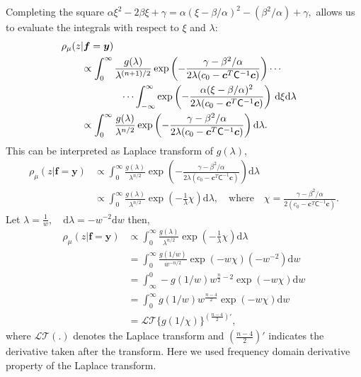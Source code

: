 \documentclass{iitthesis}          %
\newcommand{\bm}[1]{\boldsymbol{#1}}
\newcommand{\dif}[1]{\text{d}{#1}}
\newcommand{\D}[1]{\text{d}{#1}}
\newcommand{\vc}{\bm{c}}
\newcommand{\vf}{\bm{f}}
\newcommand{\vy}{\bm{y}}
\newcommand{\mC}{\mathsf{C}}
\begin{document}
Completing the square $
\alpha \xi^2 -2 \beta \xi + \gamma 
= \alpha (\xi -\beta/\alpha)^2  - (\beta^2/\alpha) + \gamma,
$
allows us to evaluate the integrals with respect to $\xi$ and $\lambda$:
\begin{align*}
\MoveEqLeft{\rho_{\mu}(z | \vf = \vy)} &
\\
& \propto \displaystyle \int_{0}^\infty  \frac{g(\lambda)}{\lambda^{(n+1)/2}}  \exp\left( -\frac{  \gamma - \beta^2/\alpha}{2\lambda(c_0  -\vc ^T \mC^{-1} \vc)} \right)  \cdots 
\\
& \qquad \qquad \cdots \int_{-\infty}^\infty  \exp\left( -\frac{\alpha (\xi -\beta/\alpha)^2}{2\lambda(c_0  -\vc ^T \mC^{-1} \vc)} \right) \, \D \xi \D \lambda 
\\
& \propto \displaystyle \int_{0}^\infty  \frac{g(\lambda)}{\lambda^{n/2}}  \exp\left( -\frac{  \gamma - \beta^2/\alpha}{2\lambda(c_0  -\vc ^T \mC^{-1} \vc)} \right) \D \lambda 
.
\end{align*}
This can be interpreted as Laplace transform of $g(\lambda)$,
\begin{align*}
{\rho_{\mu}(z | \vf = \vy)} 
& \propto \displaystyle \int_{0}^\infty  \frac{g(\lambda)}{\lambda^{n/2}}  \exp\left( -\frac{  \gamma - \beta^2/\alpha}{2\lambda(c_0  -\vc ^T \mC^{-1} \vc)} \right) \D \lambda 
\\
& \propto \int_{0}^\infty \frac{g(\lambda)}{\lambda^{n/2}}
\exp \left(  - \frac{1}{\lambda} \chi \right)
\dif{\lambda}, \quad \text{where} \quad \chi = \frac{  \gamma - \beta^2/\alpha}{2(c_0  -\vc ^T \mC^{-1} \vc)}.
\end{align*}
Let $\displaystyle \lambda = \frac{1}{w}, \quad \dif{\lambda} = -w^{-2} \dif{w}$ then,
\begin{align*}
{\rho_{\mu}(z | \vf = \vy)} 
& \propto \int_{0}^\infty \frac{g(\lambda)}{\lambda^{n/2}}
\exp \left(  - \frac{1}{\lambda} \chi \right)
\dif{\lambda} 
\\
&= \int_{0}^\infty \frac{g(1/w)  }{w^{-n/2}}
\exp \left(  - w \chi \right)
(-w^{-2})\dif{w}
\\
&= \int_\infty^0 -g(1/w) w^{\frac n2 - 2}
\exp \left(  - w \chi \right)
\D{w}
\\
&= \int_0^\infty g(1/w) w^{\frac{n-4}2}
\exp \left(  - w \chi \right)
\D{w}
\\
& = \mathcal{LT} \{ g(1/\chi) \}^{(\frac{n-4}2)'},
\end{align*}
where $\mathcal{LT}(.)$ denotes the Laplace transform and $(\frac{n-4}2)'$ indicates the derivative taken after the transform. Here we used frequency domain derivative property of the Laplace transform. 
\end{document}
